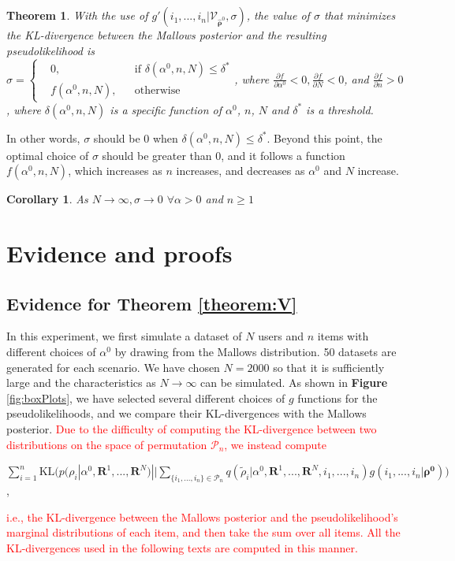 \documentclass[11pt, oneside]{article}   	%
\newtheorem{theorem}{Theorem}[subsection]
\newtheorem{corollary}{Corollary}[theorem]
\begin{document}
\subsection{ }
\begin{theorem}\label{theorem:sigmafunction}
With the use of  $g'(i_1, ...,i_n|\mathcal{V}_{\hat{\bm{\rho}}^0}, \sigma)$, the value of $\sigma$ that minimizes the KL-divergence between the Mallows posterior and the resulting pseudolikelihood is\\
 $
\sigma = \left \{
\begin{aligned}
&0, && \text{if } \delta(\alpha^0,n,N)\leq \delta ^{*} \\
&f(\alpha^0, n,N), && \text{otherwise}
\end{aligned} \right.
$, where $\frac{\partial f}{\partial \alpha^0} <0, \frac{\partial f}{\partial N} <0$, and $\frac{\partial f}{\partial n} >0$, where $\delta(\alpha^0, n,N)$ is a specific function of $\alpha^0$, $n$, $N$ and $\delta ^*$ is a threshold.
\end{theorem}

In other words, $\sigma$ should be 0 when $\delta(\alpha^0,n,N) \leq \delta^*$. Beyond this point, the optimal choice of $\sigma$ should be greater than 0, and it follows a function $f(\alpha^0,n,N)$, which increases as $n$ increases, and decreases as $\alpha^0$ and $N$ increase.
\begin{corollary}
	As $N \rightarrow \infty,\sigma \rightarrow 0$  $ \forall \alpha >0$ and $n \geq 1$
\end{corollary}

\section{Evidence and proofs}
\subsection{Evidence for Theorem \ref{theorem:V}}
In this experiment, we first simulate a dataset of $N$ users and $n$ items with different choices of $\alpha^0$ by drawing from the Mallows distribution.  50 datasets are generated for each scenario. We have chosen $N = 2000$ so that it is sufficiently large and the characteristics as $N \rightarrow \infty$ can be simulated. As shown in \textbf{Figure} \ref{fig:boxPlots}, we have selected several different choices of $g$ functions for the pseudolikelihoods, and we compare their KL-divergences with the Mallows posterior. \textcolor{red}{Due to the difficulty of computing the KL-divergence between two distributions on the space of permutation $\mathcal{P}_n$, we instead compute }
\begin{center}

 $\sum\limits_{i=1}^{n}\text{KL}\big( p(\rho_i|\alpha^0, \bm{R}^1,..., \bm{R}^N) || \sum\limits_{\{i_1, ..., i_n\}\in \mathcal{P}_n}q(\tilde{{\rho}}_i|\alpha^0, \bm{R}^1, ..., \bm{R}^N, i_1, ..., i_n)g(i_1, ..., i_n|\bm{\rho^0})\big)$, \end{center}\textcolor{red}{i.e., the KL-divergence between the Mallows posterior and the pseudolikelihood's marginal distributions of each item, and then take the sum over all items. All the KL-divergences used in the following texts are computed in this manner.} 
\end{document}

